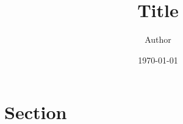 \documentclass[10pt, oneside]{article}
\title{Title}
\author{Author}
\date{\today}
\begin{document}
\maketitle
\vspace{25px}

\section{Section}
\blindtext[1]
\end{document}
